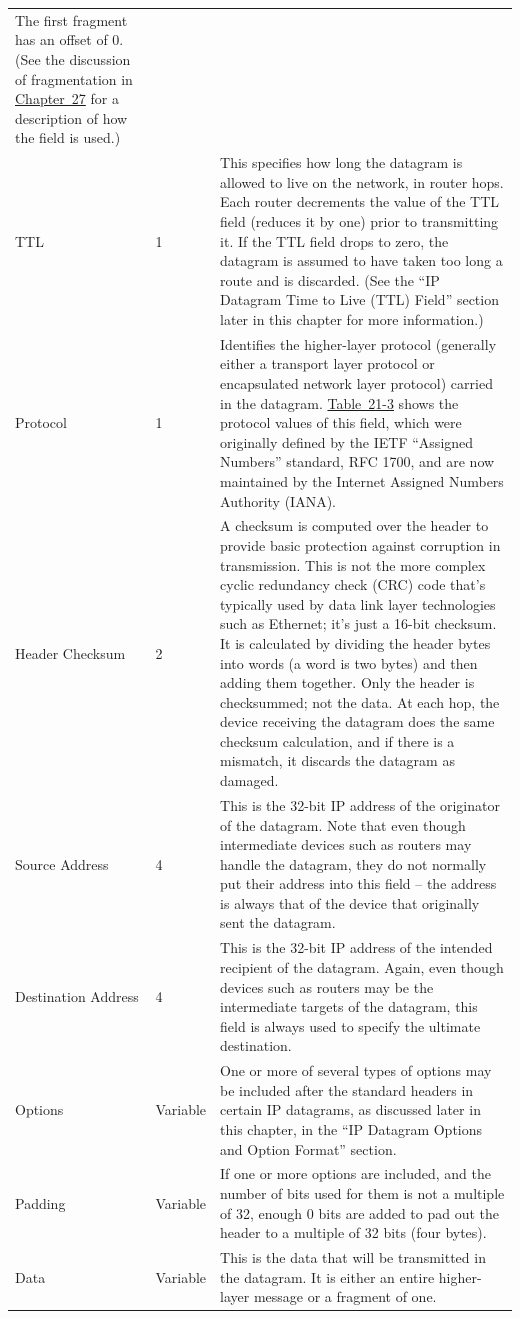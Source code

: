 \begin{longtable}[]{@{}lll@{}}
The first fragment has an offset of 0. (See the discussion of
fragmentation in \protect\hyperlink{ch27.html}{Chapter~27} for a
description of how the field is used.)\tabularnewline
TTL & 1 & This specifies how long the datagram is allowed to live on the
network, in router hops. Each router decrements the value of the TTL
field (reduces it by one) prior to transmitting it. If the TTL field
drops to zero, the datagram is assumed to have taken too long a route
and is discarded. (See the ``IP Datagram Time to Live (TTL) Field''
section later in this chapter for more information.)\tabularnewline
Protocol & 1 & Identifies the higher-layer protocol (generally either a
transport layer protocol or encapsulated network layer protocol) carried
in the datagram.
\protect\hyperlink{ch21s02.htmlux5cux23ipv_protocol_subfields}{Table~21-3}
shows the protocol values of this field, which were originally defined
by the IETF ``Assigned Numbers'' standard, RFC 1700, and are now
maintained by the Internet Assigned Numbers Authority
(IANA).\tabularnewline
Header Checksum & 2 & A checksum is computed over the header to provide
basic protection against corruption in transmission. This is not the
more complex cyclic redundancy check (CRC) code that's typically used by
data link layer technologies such as Ethernet; it's just a 16-bit
checksum. It is calculated by dividing the header bytes into words (a
word is two bytes) and then adding them together. Only the header is
checksummed; not the data. At each hop, the device receiving the
datagram does the same checksum calculation, and if there is a mismatch,
it discards the datagram as damaged.\tabularnewline
Source Address & 4 & This is the 32-bit IP address of the originator of
the datagram. Note that even though intermediate devices such as routers
may handle the datagram, they do not normally put their address into
this field -- the address is always that of the device that originally
sent the datagram.\tabularnewline
Destination Address & 4 & This is the 32-bit IP address of the intended
recipient of the datagram. Again, even though devices such as routers
may be the intermediate targets of the datagram, this field is always
used to specify the ultimate destination.\tabularnewline
Options & Variable & One or more of several types of options may be
included after the standard headers in certain IP datagrams, as
discussed later in this chapter, in the ``IP Datagram Options and Option
Format'' section.\tabularnewline
Padding & Variable & If one or more options are included, and the number
of bits used for them is not a multiple of 32, enough 0 bits are added
to pad out the header to a multiple of 32 bits (four
bytes).\tabularnewline
Data & Variable & This is the data that will be transmitted in the
datagram. It is either an entire higher-layer message or a fragment of
one.\tabularnewline
\bottomrule
\end{longtable}



